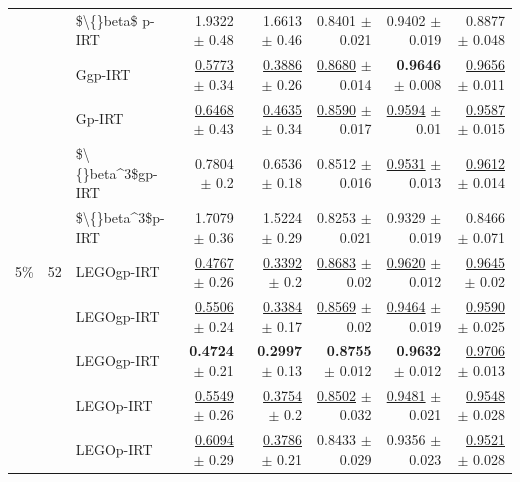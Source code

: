 \begin{longtable}{llp{}rrrrr}
 &  & \$\textbackslash\{\}beta\$ p-IRT & 1.9322 {\scriptsize $\pm$ 0.48} & 1.6613 {\scriptsize $\pm$ 0.46} & 0.8401 {\scriptsize $\pm$ 0.021} & 0.9402 {\scriptsize $\pm$ 0.019} & 0.8877 {\scriptsize $\pm$ 0.048} \\
 &  & Ggp-IRT & \underline{0.5773} {\scriptsize $\pm$ 0.34} & \underline{0.3886} {\scriptsize $\pm$ 0.26} & \underline{0.8680} {\scriptsize $\pm$ 0.014} & \textbf{0.9646} {\scriptsize $\pm$ 0.008} & \underline{0.9656} {\scriptsize $\pm$ 0.011} \\
 &  & Gp-IRT & \underline{0.6468} {\scriptsize $\pm$ 0.43} & \underline{0.4635} {\scriptsize $\pm$ 0.34} & \underline{0.8590} {\scriptsize $\pm$ 0.017} & \underline{0.9594} {\scriptsize $\pm$ 0.01} & \underline{0.9587} {\scriptsize $\pm$ 0.015} \\
 &  & \$\textbackslash\{\}beta\textasciicircum{}3\$gp-IRT & 0.7804 {\scriptsize $\pm$ 0.2} & 0.6536 {\scriptsize $\pm$ 0.18} & 0.8512 {\scriptsize $\pm$ 0.016} & \underline{0.9531} {\scriptsize $\pm$ 0.013} & \underline{0.9612} {\scriptsize $\pm$ 0.014} \\
 &  & \$\textbackslash\{\}beta\textasciicircum{}3\$p-IRT & 1.7079 {\scriptsize $\pm$ 0.36} & 1.5224 {\scriptsize $\pm$ 0.29} & 0.8253 {\scriptsize $\pm$ 0.021} & 0.9329 {\scriptsize $\pm$ 0.019} & 0.8466 {\scriptsize $\pm$ 0.071} \\
\midrule
5\% & 52 & LEGOgp-IRT & \underline{0.4767} {\scriptsize $\pm$ 0.26} & \underline{0.3392} {\scriptsize $\pm$ 0.2} & \underline{0.8683} {\scriptsize $\pm$ 0.02} & \underline{0.9620} {\scriptsize $\pm$ 0.012} & \underline{0.9645} {\scriptsize $\pm$ 0.02} \\
 &  & LEGOgp-IRT & \underline{0.5506} {\scriptsize $\pm$ 0.24} & \underline{0.3384} {\scriptsize $\pm$ 0.17} & \underline{0.8569} {\scriptsize $\pm$ 0.02} & \underline{0.9464} {\scriptsize $\pm$ 0.019} & \underline{0.9590} {\scriptsize $\pm$ 0.025} \\
 &  & LEGOgp-IRT & \textbf{0.4724} {\scriptsize $\pm$ 0.21} & \textbf{0.2997} {\scriptsize $\pm$ 0.13} & \textbf{0.8755} {\scriptsize $\pm$ 0.012} & \textbf{0.9632} {\scriptsize $\pm$ 0.012} & \underline{0.9706} {\scriptsize $\pm$ 0.013} \\
 &  & LEGOp-IRT & \underline{0.5549} {\scriptsize $\pm$ 0.26} & \underline{0.3754} {\scriptsize $\pm$ 0.2} & \underline{0.8502} {\scriptsize $\pm$ 0.032} & \underline{0.9481} {\scriptsize $\pm$ 0.021} & \underline{0.9548} {\scriptsize $\pm$ 0.028} \\
 &  & LEGOp-IRT & \underline{0.6094} {\scriptsize $\pm$ 0.29} & \underline{0.3786} {\scriptsize $\pm$ 0.21} & 0.8433 {\scriptsize $\pm$ 0.029} & 0.9356 {\scriptsize $\pm$ 0.023} & \underline{0.9521} {\scriptsize $\pm$ 0.028} \\

\end{longtable}
